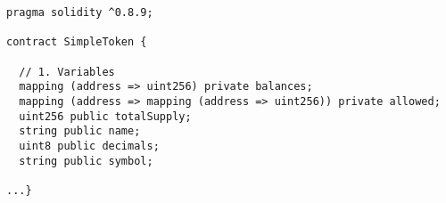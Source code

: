 \begin{lstlisting}[language=Solidity]
pragma solidity ^0.8.9;

contract SimpleToken {

  // 1. Variables
  mapping (address => uint256) private balances;
  mapping (address => mapping (address => uint256)) private allowed;
  uint256 public totalSupply;
  string public name;
  uint8 public decimals;
  string public symbol;
    
...}
\end{lstlisting}